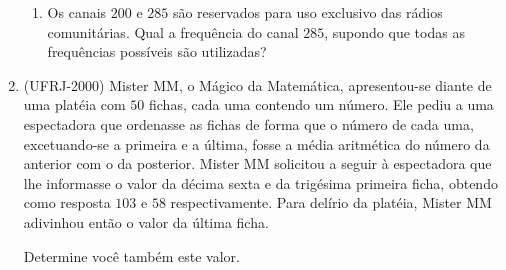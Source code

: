 \begin{enumerate}
\begin{enumerate}
\item {} 
Os canais \(200\) e \(285\) são reservados para uso exclusivo das rádios comunitárias. Qual a frequência do canal \(285\), supondo que todas as frequências possíveis são utilizadas?

\end{enumerate}

\item (UFRJ-2000) Mister MM, o Mágico da Matemática, apresentou-se diante de uma platéia com \(50\) fichas, cada uma contendo um número. Ele pediu a uma espectadora que ordenasse as fichas de forma que o número de cada uma, excetuando-se a primeira e a última, fosse a média aritmética do número da anterior com o da posterior. Mister MM solicitou a seguir à espectadora que lhe informasse o valor da décima sexta e da trigésima primeira ficha, obtendo como resposta \(103\) e \(58\) respectivamente. Para delírio da platéia, Mister MM adivinhou então o valor da última ficha.

Determine você também este valor.

\end{enumerate}

\ifnum{}
\clearpage
\else
\notasfinais
\fi




\nocite{*}